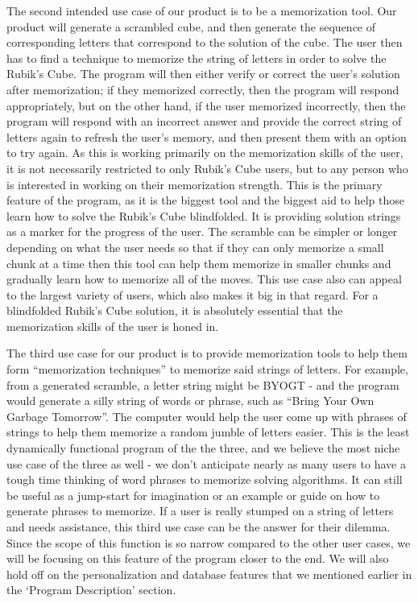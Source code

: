 \documentclass[12pt]{article}
\begin{document}
\par
The second intended use case of our product is to be a memorization tool. Our product will generate a scrambled cube, and then generate the sequence of corresponding letters that correspond to the solution of the cube. The user then has to find a technique to memorize the string of letters in order to solve the Rubik’s Cube. The program will then either verify or correct the user’s solution after memorization; if they memorized correctly, then the program will respond appropriately, but on the other hand, if the user memorized incorrectly, then the program will respond with an incorrect answer and provide the correct string of letters again to refresh the user’s memory, and then present them with an option to try again. As this is working primarily on the memorization skills of the user, it is not necessarily restricted to only Rubik’s Cube users, but to any person who is interested in working on their memorization strength. This is the primary feature of the program, as it is the biggest tool and the biggest aid to help those learn how to solve the Rubik’s Cube blindfolded. It is providing solution strings as a marker for the progress of the user. The scramble can be simpler or longer depending on what the user needs so that if they can only memorize a small chunk at a time then this tool can help them memorize in smaller chunks and gradually learn how to memorize all of the moves. This use case also can appeal to the largest variety of users, which also makes it big in that regard. For a blindfolded Rubik’s Cube solution, it is absolutely essential that the memorization skills of the user is honed in. \\

\par
The third use case for our product is to provide memorization tools to help them form “memorization techniques” to memorize said strings of letters. For example, from a generated scramble, a letter string might be BYOGT - and the program would generate a silly string of words or phrase, such as “Bring Your Own Garbage Tomorrow”. The computer would help the user come up with phrases of strings to help them memorize a random jumble of letters easier. This is the least dynamically functional program of the the three, and we believe the most niche use case of the three as well - we don’t anticipate nearly as many users to have a tough time thinking of word phrases to memorize solving algorithms. It can still be useful as a jump-start for imagination or an example or guide on how to generate phrases to memorize. If a user is really stumped on a string of letters and needs assistance, this third use case can be the answer for their dilemma. Since the scope of this function is so narrow compared to the other user cases, we will be focusing on this feature of the program closer to the end. We will also hold off on the personalization and database features that we mentioned earlier in the ‘Program Description’ section. \\
\end{document}

